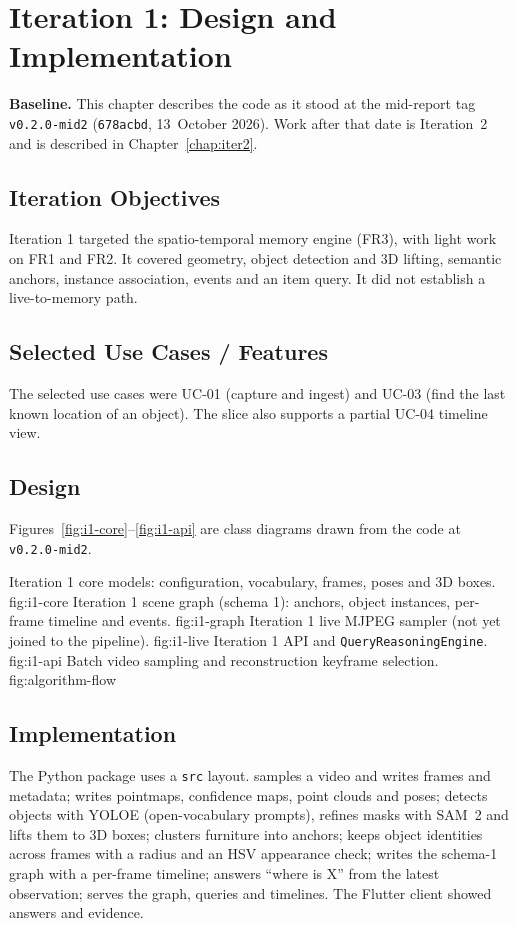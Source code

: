 \chapter{Iteration 1: Design and Implementation}
\label{chap:iter1}
\textbf{Baseline.} This chapter describes the code as it stood at the mid-report
tag \texttt{v0.2.0-mid2} (\texttt{678acbd}, 13~October 2026). Work after that
date is Iteration~2 and is described in Chapter~\ref{chap:iter2}.

\section{Iteration Objectives}
Iteration 1 targeted the spatio-temporal memory engine (FR3), with light work on
FR1 and FR2. It covered geometry, object detection and 3D lifting, semantic
anchors, instance association, events and an item query. It did not establish
a live-to-memory path.

\section{Selected Use Cases / Features}
The selected use cases were UC-01 (capture and ingest) and UC-03 (find the last
known location of an object). The slice also supports a partial UC-04 timeline
view.

\section{Design}
Figures~\ref{fig:i1-core}--\ref{fig:i1-api} are class diagrams drawn from the
code at \texttt{v0.2.0-mid2}.

  {Iteration 1 core models: configuration, vocabulary, frames, poses and 3D boxes.}
  {fig:i1-core}
  {Iteration 1 scene graph (schema 1): anchors, object instances, per-frame
   timeline and events.}
  {fig:i1-graph}
  {Iteration 1 live MJPEG sampler (not yet joined to the pipeline).}
  {fig:i1-live}
  {Iteration 1 API and \texttt{QueryReasoningEngine}.}
  {fig:i1-api}
  {Batch video sampling and reconstruction keyframe selection.}
  {fig:algorithm-flow}

\section{Implementation}
The Python package uses a \texttt{src} layout. 
samples a video and writes frames and metadata; 
writes pointmaps, confidence maps, point clouds and poses;
 detects objects with YOLOE (open-vocabulary prompts),
refines masks with SAM~2 and lifts them to 3D boxes; 
clusters furniture into anchors;  keeps object
identities across frames with a radius and an HSV appearance check;
 writes the schema-1 graph with a per-frame
timeline;  answers ``where is X'' from the latest
observation;  serves the graph, queries and timelines.
The Flutter client  showed answers and evidence.

